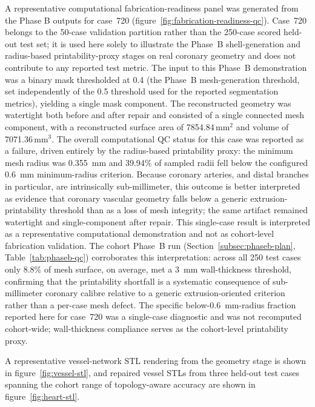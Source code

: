 \documentclass[anonymous]{iopjournal}
\begin{document}
A representative computational fabrication-readiness panel was generated from the Phase B outputs for case~720 (figure~\ref{fig:fabrication-readiness-qc}). Case~720 belongs to the 50-case validation partition rather than the 250-case scored held-out test set; it is used here solely to illustrate the Phase~B shell-generation and radius-based printability-proxy stages on real coronary geometry and does not contribute to any reported test metric. The input to this Phase~B demonstration was a binary mask thresholded at 0.4 (the Phase~B mesh-generation threshold, set independently of the 0.5 threshold used for the reported segmentation metrics), yielding a single mask component. The reconstructed geometry was watertight both before and after repair and consisted of a single connected mesh component, with a reconstructed surface area of 7854.84\,mm$^2$ and volume of 7071.36\,mm$^3$. The overall computational QC status for this case was reported as a failure, driven entirely by the radius-based printability proxy: the minimum mesh radius was \SI{0.355}{mm} and 39.94\% of sampled radii fell below the configured \SI{0.6}{mm} minimum-radius criterion. Because coronary arteries, and distal branches in particular, are intrinsically sub-millimeter, this outcome is better interpreted as evidence that coronary vascular geometry falls below a generic extrusion-printability threshold than as a loss of mesh integrity; the same artifact remained watertight and single-component after repair. This single-case result is interpreted as a representative computational demonstration and not as cohort-level fabrication validation. The cohort Phase~B run (Section~\ref{subsec:phaseb-plan}, Table~\ref{tab:phaseb-qc}) corroborates this interpretation: across all 250 test cases only 8.8\% of mesh surface, on average, met a \SI{3}{mm} wall-thickness threshold, confirming that the printability shortfall is a systematic consequence of sub-millimeter coronary calibre relative to a generic extrusion-oriented criterion rather than a per-case mesh defect. The specific below-\SI{0.6}{mm}-radius fraction reported here for case~720 was a single-case diagnostic and was not recomputed cohort-wide; wall-thickness compliance serves as the cohort-level printability proxy.

A representative vessel-network STL rendering from the geometry stage is shown in figure~\ref{fig:vessel-stl}, and repaired vessel STLs from three held-out test cases spanning the cohort range of topology-aware accuracy are shown in figure~\ref{fig:heart-stl}.
\end{document}
